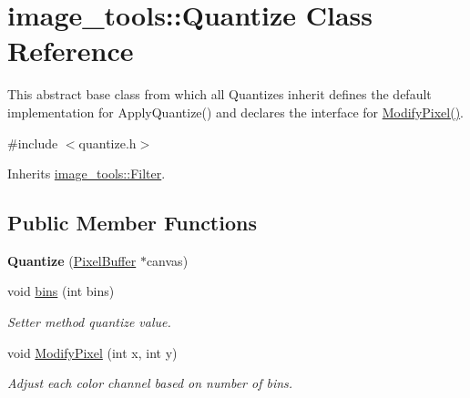 \hypertarget{classimage__tools_1_1Quantize}{}\section{image\+\_\+tools\+:\+:Quantize Class Reference}
\label{classimage__tools_1_1Quantize}


This abstract base class from which all Quantizes inherit defines the default implementation for Apply\+Quantize() and declares the interface for \hyperlink{classimage__tools_1_1Quantize_a6bcad798751b09dcc88f343d8bfc65f8}{Modify\+Pixel()}.  




{\ttfamily \#include $<$quantize.\+h$>$}



Inherits \hyperlink{classimage__tools_1_1Filter}{image\+\_\+tools\+::\+Filter}.

\subsection*{Public Member Functions}
\begin{DoxyCompactItemize}
\item 
{\bfseries Quantize} (\hyperlink{classimage__tools_1_1PixelBuffer}{Pixel\+Buffer} $\ast$canvas)\hypertarget{classimage__tools_1_1Quantize_aa4b40d2f2338f586b78670c0513f8d3e}{}\label{classimage__tools_1_1Quantize_aa4b40d2f2338f586b78670c0513f8d3e}

\item 
void \hyperlink{classimage__tools_1_1Quantize_ab034727af9fe2833faeb5aa68ac86e4b}{bins} (int bins)\hypertarget{classimage__tools_1_1Quantize_ab034727af9fe2833faeb5aa68ac86e4b}{}\label{classimage__tools_1_1Quantize_ab034727af9fe2833faeb5aa68ac86e4b}

\begin{DoxyCompactList}\small\item\em Setter method quantize value. \end{DoxyCompactList}\item 
void \hyperlink{classimage__tools_1_1Quantize_a6bcad798751b09dcc88f343d8bfc65f8}{Modify\+Pixel} (int x, int y)\hypertarget{classimage__tools_1_1Quantize_a6bcad798751b09dcc88f343d8bfc65f8}{}\label{classimage__tools_1_1Quantize_a6bcad798751b09dcc88f343d8bfc65f8}

\begin{DoxyCompactList}\small\item\em Adjust each color channel based on number of bins. \end{DoxyCompactList}\end{DoxyCompactItemize}
